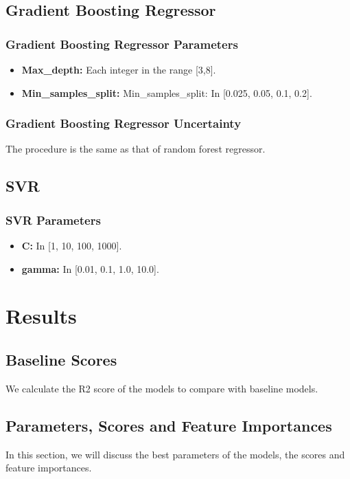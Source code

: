 \documentclass{article}
\begin{document}
\subsection{Gradient Boosting Regressor}

\subsubsection{Gradient Boosting Regressor Parameters}
\begin{itemize}
\item \textbf{Max\_depth:}
Each integer in the range [3,8].
\item \textbf{Min\_samples\_split:}
Min\_samples\_split: In [0.025, 0.05, 0.1, 0.2].
\end{itemize}

\subsubsection{Gradient Boosting Regressor Uncertainty}
The procedure is the same as that of random forest regressor.

\subsection{SVR}

\subsubsection{SVR Parameters}
\begin{itemize}
\item \textbf{C:}
In [1, 10, 100, 1000].
\item \textbf{gamma:}
In [0.01, 0.1, 1.0, 10.0].
\end{itemize}


\section{Results}
\subsection{Baseline Scores}
We calculate the R2 score of the models to compare with baseline models.
\subsection{Parameters, Scores and Feature Importances}
In this section, we will discuss the best parameters of the models, the scores and feature importances.
\end{document}

